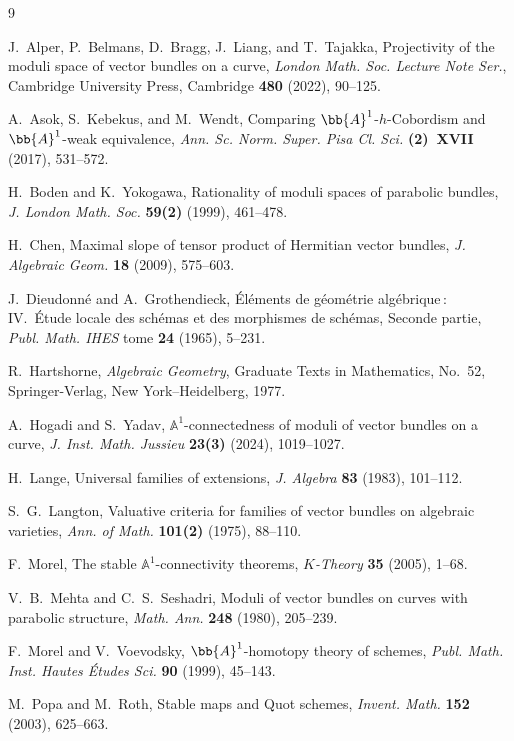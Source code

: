 	\begin{thebibliography}{9}
		
		J.~Alper, P.~Belmans, D.~Bragg, J.~Liang, and T.~Tajakka,
		Projectivity of the moduli space of vector bundles on a curve,
		\textit{London Math. Soc. Lecture Note Ser.},
		Cambridge University Press, Cambridge \textbf{480} (2022), 90--125.
		
		A.~Asok, S.~Kebekus, and M.~Wendt,
		Comparing $\bb{A}^1$-$h$-Cobordism and $\bb{A}^1$-weak equivalence,
		\textit{Ann. Sc. Norm. Super. Pisa Cl. Sci.} \textbf{(2)~XVII} (2017),
		531--572.
		
		H.~Boden and K.~Yokogawa,
		Rationality of moduli spaces of parabolic bundles,
		\textit{J. London Math. Soc.} \textbf{59(2)} (1999), 461--478.
		
		H.~Chen,
		Maximal slope of tensor product of Hermitian vector bundles,
		\textit{J. Algebraic Geom.} \textbf{18} (2009), 575--603.
		
		J.~Dieudonn\'e and A.~Grothendieck,
		\'El\'ements de g\'eom\'etrie alg\'ebrique\,: IV.~\'Etude locale des
		sch\'emas et des morphismes de sch\'emas, Seconde partie,
		\textit{Publ. Math. IHES} tome \textbf{24} (1965), 5--231.
		
		R.~Hartshorne,
		\textit{Algebraic Geometry},
		Graduate Texts in Mathematics, No.~52,
		Springer-Verlag, New York--Heidelberg, 1977.
		
		A.~Hogadi and S.~Yadav,
		${\mathbb A}^1$-connectedness of moduli of vector bundles on a curve,
		\textit{J. Inst. Math. Jussieu} \textbf{23(3)} (2024), 1019--1027.
		
		H.~Lange,
		Universal families of extensions,
		\textit{J. Algebra} \textbf{83} (1983), 101--112.
		
		S.~G.~Langton,
		Valuative criteria for families of vector bundles on algebraic varieties,
		\textit{Ann. of Math.} \textbf{101(2)} (1975), 88--110.
		
		F.~Morel,
		The stable $\mathbb{A}^1$-connectivity theorems,
		\textit{$K$-Theory} \textbf{35} (2005), 1--68.
		
		V.~B.~Mehta and C.~S.~Seshadri,
		Moduli of vector bundles on curves with parabolic structure,
		\textit{Math. Ann.} \textbf{248} (1980), 205--239.
		
		F.~Morel and V.~Voevodsky,
		$\bb{A}^1$-homotopy theory of schemes,
		\textit{Publ. Math. Inst. Hautes \'Etudes Sci.} \textbf{90} (1999), 45--143.
		
		M.~Popa and M.~Roth,
		Stable maps and Quot schemes,
		\textit{Invent. Math.} \textbf{152} (2003), 625--663.
		
		
	\end{thebibliography}
